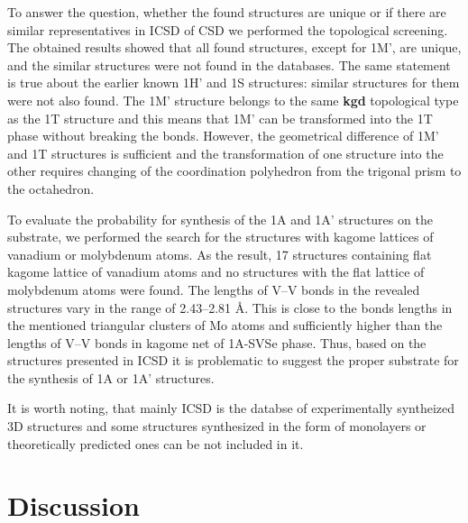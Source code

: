 \documentclass[a4paperm]{article}
\begin{document}
To answer the question, whether the found structures are unique or if there are similar representatives in ICSD of CSD we performed the topological screening.
The obtained results showed that all found structures, except for 1M', are unique, and the similar structures were not found in the databases.
The same statement is true about the earlier known 1H' and 1S structures: similar structures for them were not also found. 
The 1M' structure belongs to the same {\bf kgd} topological type as the 1T structure and this means that 1M' can be transformed into the 1T phase without breaking the bonds.
However, the geometrical difference of 1M' and 1T structures is sufficient and the transformation of one structure into the other requires changing of the coordination polyhedron from the trigonal prism to the octahedron.

To evaluate the probability for synthesis of the 1A and 1A' structures on the substrate, we performed the search for the structures with kagome lattices of vanadium or molybdenum atoms.
As the result, 17 structures containing flat kagome lattice of vanadium atoms and no structures with the flat lattice of molybdenum atoms were found. 
The lengths of V--V bonds in the revealed structures vary in the range of 2.43--2.81 \AA.
This is close to the bonds lengths in the mentioned triangular clusters of Mo atoms and sufficiently higher than the lengths of V--V bonds in kagome net of 1A-SVSe phase.
Thus, based on the structures presented in ICSD it is problematic to suggest the proper substrate for the synthesis of 1A or 1A' structures.

It is worth noting, that mainly ICSD is the databse of experimentally syntheized 3D structures and  some structures synthesized in the form of monolayers or theoretically predicted ones can be not included in it.



\section{Discussion}
\end{document}
